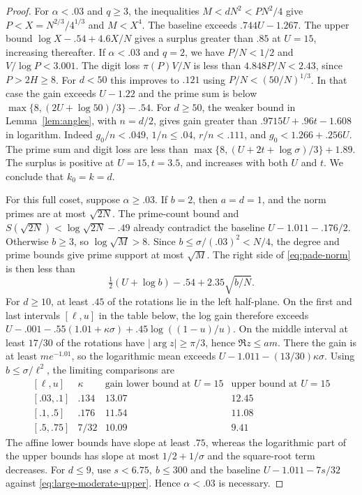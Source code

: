 \begin{proof}
For \(\alpha<.03\) and \(q\ge3\), the inequalities
\(M<dN^2<PN^2/4\) give \(P<X=N^{2/3}/4^{1/3}\)
and \(M<X^4\). The baseline exceeds \(.744U-1.267\).
The upper bound \(\log X-.54+4.6X/N\) gives a surplus
greater than \(.85\) at \(U=15\), increasing thereafter.
If \(\alpha<.03\) and \(q=2\), we have \(P/N<1/2\) and
\(V/\log P<3.001\). The digit loss \(\pi(P)V/N\) is less
than \(4.848P/N<2.43\), since \(P>2H\ge8\).
For \(d<50\) this improves to \(.121\) using
\(P/N<(50/N)^{1/3}\). In that case the gain exceeds \(U-1.22\)
and the prime sum is below
\(\max\{8,(2U+\log50)/3\}-.54\). For \(d\ge50\), the
weaker bound in Lemma~\ref{lem:angles}, with \(n=d/2\),
gives gain greater than \(.9715U+.96t-1.608\) in logarithm.
Indeed \(g_0/n<.049\), \(1/n\le.04\),
\(r/n<.111\), and \(g_0<1.266+.256U\).
The prime sum and digit loss are less than
\(\max\{8,(U+2t+\log\sigma)/3\}+1.89\).
The surplus is positive at \(U=15,t=3.5\), and increases
with both \(U\) and \(t\). We conclude that \(k_0=k=d\).

For this full coset, suppose \(\alpha\ge.03\).
If \(b=2\), then \(a=d=1\), and the norm primes are at
most \(\sqrt{2N}\). The prime-count bound and
\(S(\sqrt{2N})<\log\sqrt{2N}-.49\) already contradict
the baseline \(U-1.011-.176/2\).
Otherwise \(b\ge3\), so \(\log\sqrt M>8\). Since
\(b\le\sigma/(.03)^2<N/4\), the degree and prime bounds
give prime support at most \(\sqrt M\). The right side of
\eqref{eq:pade-norm} is then less than
\begin{equation}\label{eq:large-moderate-upper}
 \tfrac12(U+\log b)-.54+2.35\sqrt{b/N}.
\end{equation}
For \(d\ge10\), at least \(.45\) of the rotations lie in the
left half-plane. On the first and last intervals
\([\ell,u]\) in the table below, the log gain therefore exceeds
\(U-.001-.55(1.01+\kappa\sigma)+.45\log((1-u)/u)\).
On the middle interval at least \(17/30\) of the rotations
have \(|\arg z|\ge\pi/3\), hence \(\Re z\le am\). There the
gain is at least \(me^{-1.01}\), so the logarithmic mean
exceeds \(U-1.011-(13/30)\kappa\sigma\).
Using \(b\le\sigma/\ell^2\), the limiting comparisons are
\[
\begin{array}{c|c|cc}
{}[\ell,u]&\kappa&\text{gain lower bound at }U=15
                    &\text{upper bound at }U=15\\ \hline
{}[.03,.1]&.134&13.07&12.45\\
{}[.1,.5]&.176&11.54&11.08\\
{}[.5,.75]&7/32&10.09&9.41
\end{array}
\]
The affine lower bounds have slope at least \(.75\), whereas
the logarithmic part of the upper bounds has slope at most
\(1/2+1/\sigma\) and the square-root term decreases.
For \(d\le9\),
use \(s<6.75,\ b\le300\) and the baseline
\(U-1.011-7s/32\) against \eqref{eq:large-moderate-upper}.
Hence \(\alpha<.03\) is necessary.


\end{proof}
